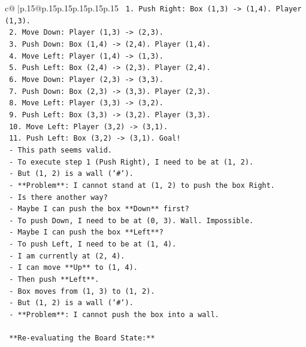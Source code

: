 \documentclass{article}
\begin{document}
{\begin{supertabular}{c@{$\;$}|p{.15\linewidth}@{}p{.15\linewidth}p{.15\linewidth}p{.15\linewidth}p{.15\linewidth}p{.15\linewidth}}
{{{\texttt{    1. Push Right: Box (1,3) {-}> (1,4). Player (1,3).} \\
\texttt{    2. Move Down: Player (1,3) {-}> (2,3).} \\
\texttt{    3. Push Down: Box (1,4) {-}> (2,4). Player (1,4).} \\
\texttt{    4. Move Left: Player (1,4) {-}> (1,3).} \\
\texttt{    5. Push Left: Box (2,4) {-}> (2,3). Player (2,4).} \\
\texttt{    6. Move Down: Player (2,3) {-}> (3,3).} \\
\texttt{    7. Push Down: Box (2,3) {-}> (3,3). Player (2,3).} \\
\texttt{    8. Move Left: Player (3,3) {-}> (3,2).} \\
\texttt{    9. Push Left: Box (3,3) {-}> (3,2). Player (3,3).} \\
\texttt{    10. Move Left: Player (3,2) {-}> (3,1).} \\
\texttt{    11. Push Left: Box (3,2) {-}> (3,1). Goal!} \\
\texttt{  {-} This path seems valid.} \\
\texttt{  {-} To execute step 1 (Push Right), I need to be at (1, 2).} \\
\texttt{  {-} But (1, 2) is a wall (`\#`).} \\
\texttt{  {-} **Problem**: I cannot stand at (1, 2) to push the box Right.} \\
\texttt{  {-} Is there another way?} \\
\texttt{  {-} Maybe I can push the box **Down** first?} \\
\texttt{    {-} To push Down, I need to be at (0, 3). Wall. Impossible.} \\
\texttt{  {-} Maybe I can push the box **Left**?} \\
\texttt{    {-} To push Left, I need to be at (1, 4).} \\
\texttt{    {-} I am currently at (2, 4).} \\
\texttt{    {-} I can move **Up** to (1, 4).} \\
\texttt{    {-} Then push **Left**.} \\
\texttt{    {-} Box moves from (1, 3) to (1, 2).} \\
\texttt{    {-} But (1, 2) is a wall (`\#`).} \\
\texttt{    {-} **Problem**: I cannot push the box into a wall.} \\
\\ 
\texttt{  **Re{-}evaluating the Board State:**} \\
}}}
\end{supertabular}}
\end{document}
